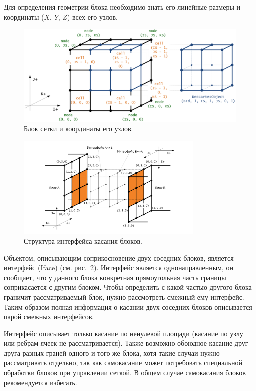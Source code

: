 Для определения геометрии блока необходимо знать его линейные размеры и координаты ($X$, $Y$, $Z$) всех его узлов.

\begin{figure}[ht]
	\centering
	\includegraphics[width=1.0\textwidth]{./pics/text_2_block/6-block-and-coords.png}
	\caption{Блок сетки и координаты его узлов.}
	\label{fig:text_2_block_block_and_coords}
\end{figure}

\begin{figure}[ht]
	\centering
	\includegraphics[width=0.8\textwidth]{./pics/text_2_block/7-iface.pdf}
	\caption{Структура интерфейса касания блоков.}
	\label{fig:text_2_block_iface}
\end{figure}

Объектом, описывающим соприкосновение двух соседних блоков, является интерфейс (Iface) (см. рис.~\ref{fig:text_2_block_iface}).
Интерфейс является однонаправленным, он сообщает, что у данного блока конкретная прямоугольная
часть границы соприкасается с другим блоком.
Чтобы определить с какой частью другого блока граничит рассматриваемый блок, нужно рассмотреть смежный ему интерфейс.
Таким образом полная информация о касании двух соседних блоков описывается парой смежных интерфейсов.

Интерфейс описывает только касание по ненулевой площади (касание по узлу или ребрам ячеек не рассматривается).
Также возможно обоюдное касание друг друга разных граней одного и того же блока, хотя такие случаи нужно рассматривать отдельно, так как самокасание может потребовать специальной обработки блоков при управлении сеткой.
В общем случае самокасания блоков рекомендуется избегать.

